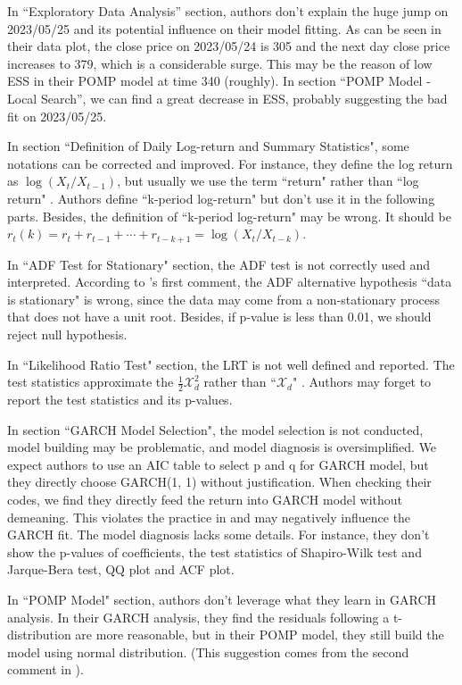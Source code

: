 \documentclass[12pt]{article}
\begin{document}
In ``Exploratory Data Analysis'' section, authors don't explain the huge jump on 2023/05/25 and its potential influence on their model fitting. As can be seen in their data plot, the close price on 2023/05/24 is 305 and the next day close price increases to 379, which is a considerable surge. This may be the reason of low ESS in their POMP model at time 340 (roughly). In section ``POMP Model - Local Search'', we can find a great decrease in ESS, probably suggesting the bad fit on 2023/05/25.


In section ``Definition of Daily Log-return and Summary Statistics", some notations can be corrected and improved. For instance, they define the log return as $\log(X_t / X_{t - 1})$, but usually we use the term ``return" rather than ``log return" \cite{2024/lec16}. Authors define ``k-period log-return" but don't use it in the following parts. Besides, the definition of ``k-period log-return" may be wrong. It should be $r_t(k) = r_t + r_{t - 1} + \cdots + r_{t - k + 1} = \log(X_t / X_{t - k})$.


In ``ADF Test for Stationary" section, the ADF test is not correctly used and interpreted. According to \cite{2022/proj05_comments}'s first comment, the ADF alternative hypothesis ``data is stationary" is wrong, since the data may come from a non-stationary process that does not have a unit root. Besides, if p-value is less than 0.01, we should reject null hypothesis.


In ``Likelihood Ratio Test" section, the LRT is not well defined and reported. The test statistics approximate the $\frac{1}{2} \mathcal{X}_d^2$ rather than ``$\mathcal{X}_d$" \cite{2024/lec05}. Authors may forget to report the test statistics and its p-values.


In section ``GARCH Model Selection", the model selection is not conducted, model building may be problematic, and model diagnosis is oversimplified. We expect authors to use an AIC table to select p and q for GARCH model, but they directly choose GARCH(1, 1) without justification. When checking their codes, we find they directly feed the return into GARCH model without demeaning. This violates the practice in \cite{2024/lec16} and may negatively influence the GARCH fit. The model diagnosis lacks some details. For instance, they don't show the p-values of coefficients, the test statistics of Shapiro-Wilk test and Jarque-Bera test, QQ plot and ACF plot.


In ``POMP Model" section, authors don't leverage what they learn in GARCH analysis. In their GARCH analysis, they find the residuals following a t-distribution are more reasonable, but in their POMP model, they still build the model using normal distribution. (This suggestion comes from the second comment in \cite{2022/proj07_comments}).
\end{document}
